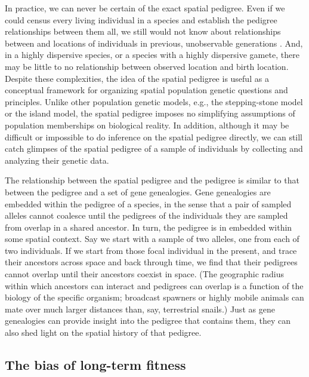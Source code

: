 \documentclass{ar-1col}
\newcommand{\plr}[1]{{\color{green}{#1}}}
\begin{document}
In practice, we can never be certain of the exact spatial pedigree.
Even if we could census every living individual in a species
and establish the pedigree relationships between them all,
we still would not know about relationships between
and locations of individuals in previous, unobservable generations \citep{wilkins2004separationoftimescales}.
And, in a highly dispersive species,
or a species with a highly dispersive gamete,
there may be little to no relationship between observed location and birth location.
Despite these complexities,
the idea of the spatial pedigree is useful
as a conceptual framework for organizing
spatial population genetic questions and principles.
Unlike other population genetic models,
e.g., the stepping-stone model or the island model,
the spatial pedigree imposes no simplifying
assumptions of population memberships on biological reality.
In addition, although it may be difficult or impossible
to do inference on the spatial pedigree directly,
we can still catch glimpses of the spatial pedigree of a sample of individuals
by collecting and analyzing their genetic data.

The relationship between the spatial pedigree and the pedigree
is similar to that between the pedigree and a set of gene genealogies.
Gene genealogies are embedded within the pedigree of a species,
in the sense that a pair of sampled alleles cannot coalesce until
the pedigrees of the individuals they are sampled from overlap in a shared ancestor.
In turn, the pedigree is in embedded within some spatial context.
Say we start with a sample of two alleles, one from each of two individuals.
If we start from those focal individual in the present,
and trace their ancestors across space and back through time,
we find that their pedigrees cannot overlap until their ancestors coexist in space.
(The geographic radius within which ancestors can interact
and pedigrees can overlap is a function of the biology of the specific organism;
broadcast spawners or highly mobile animals can mate over much larger distances than, say, terrestrial snails.)
Just as gene genealogies can provide insight into the pedigree that contains them,
they can also shed light on the spatial history of that pedigree.


\subsection{The bias of long-term fitness}
\end{document}
